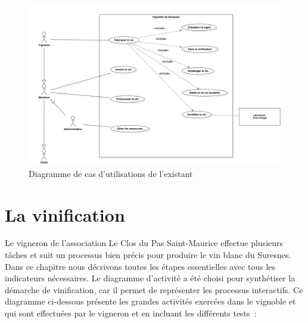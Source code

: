 \documentclass[a4paper, titlepage]{report}
\begin{document}
\begin{figure}[!h]
\centering
\includegraphics{Images/UseCaseDiagramExistant.jpg}
\caption{Diagramme de cas d'utilisations de l'existant}
\end{figure}

\section{La vinification}\label{la-vinification}

Le vigneron de l'association Le Clos du Pas Saint-Maurice effectue
plusieurs tâches et suit un processus bien précis pour produire le vin
blanc du Suresnes. Dans ce chapitre nous décrivons toutes les étapes
essentielles avec tous les indicateurs nécessaires. Le diagramme
d'activité a été choisi pour synthétiser la démarche de vinification,
car il permet de représenter les processus interactifs. Ce diagramme
ci-dessous présente les grandes activités exercées dans le vignoble et
qui sont effectuées par le vigneron et en incluant les différents
tests~:
\end{document}
